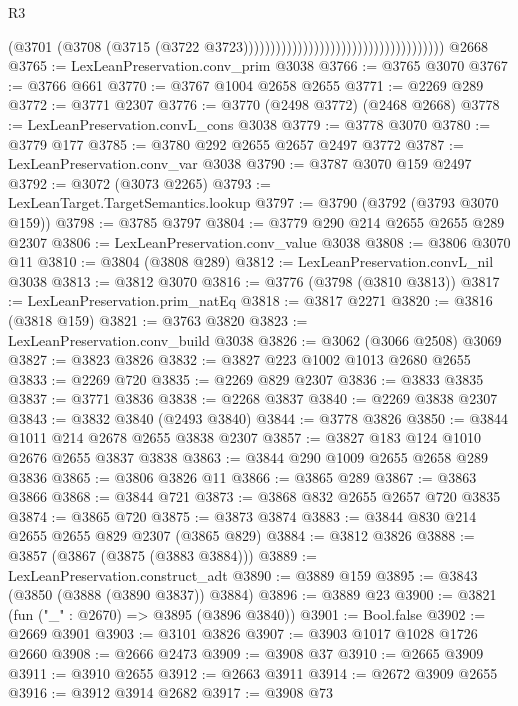 \begin{lexlean}{R3}
\begin{coremodule}
                                                                      (@3701
                                                                        (@3708
                                                                          (@3715
                                                                            (@3722
                                                                              @3723)))))))))))))))))))))))))))))))))))))
    @2668
@3765 := LexLeanPreservation.conv_prim @3038
@3766 := @3765 @3070
@3767 := @3766 @661
@3770 := @3767 @1004 @2658 @2655
@3771 := @2269 @289
@3772 := @3771 @2307
@3776 := @3770 (@2498 @3772) (@2468 @2668)
@3778 := LexLeanPreservation.convL_cons @3038
@3779 := @3778 @3070
@3780 := @3779 @177
@3785 := @3780 @292 @2655 @2657 @2497 @3772
@3787 := LexLeanPreservation.conv_var @3038
@3790 := @3787 @3070 @159 @2497
@3792 := @3072 (@3073 @2265)
@3793 := LexLeanTarget.TargetSemantics.lookup
@3797 := @3790 (@3792 (@3793 @3070 @159))
@3798 := @3785 @3797
@3804 := @3779 @290 @214 @2655 @2655 @289 @2307
@3806 := LexLeanPreservation.conv_value @3038
@3808 := @3806 @3070 @11
@3810 := @3804 (@3808 @289)
@3812 := LexLeanPreservation.convL_nil @3038
@3813 := @3812 @3070
@3816 := @3776 (@3798 (@3810 @3813))
@3817 := LexLeanPreservation.prim_natEq
@3818 := @3817 @2271
@3820 := @3816 (@3818 @159)
@3821 := @3763 @3820
@3823 := LexLeanPreservation.conv_build @3038
@3826 := @3062 (@3066 @2508) @3069
@3827 := @3823 @3826
@3832 := @3827 @223 @1002 @1013 @2680 @2655
@3833 := @2269 @720
@3835 := @2269 @829 @2307
@3836 := @3833 @3835
@3837 := @3771 @3836
@3838 := @2268 @3837
@3840 := @2269 @3838 @2307
@3843 := @3832 @3840 (@2493 @3840)
@3844 := @3778 @3826
@3850 := @3844 @1011 @214 @2678 @2655 @3838 @2307
@3857 := @3827 @183 @124 @1010 @2676 @2655 @3837 @3838
@3863 := @3844 @290 @1009 @2655 @2658 @289 @3836
@3865 := @3806 @3826 @11
@3866 := @3865 @289
@3867 := @3863 @3866
@3868 := @3844 @721
@3873 := @3868 @832 @2655 @2657 @720 @3835
@3874 := @3865 @720
@3875 := @3873 @3874
@3883 := @3844 @830 @214 @2655 @2655 @829 @2307 (@3865 @829)
@3884 := @3812 @3826
@3888 := @3857 (@3867 (@3875 (@3883 @3884)))
@3889 := LexLeanPreservation.construct_adt
@3890 := @3889 @159
@3895 := @3843 (@3850 (@3888 (@3890 @3837)) @3884)
@3896 := @3889 @23
@3900 := @3821 (fun ("_" : @2670) => @3895 (@3896 @3840))
@3901 := Bool.false
@3902 := @2669 @3901
@3903 := @3101 @3826
@3907 := @3903 @1017 @1028 @1726 @2660
@3908 := @2666 @2473
@3909 := @3908 @37
@3910 := @2665 @3909
@3911 := @3910 @2655
@3912 := @2663 @3911
@3914 := @2672 @3909 @2655
@3916 := @3912 @3914 @2682
@3917 := @3908 @73

\end{coremodule}
\end{lexlean}
